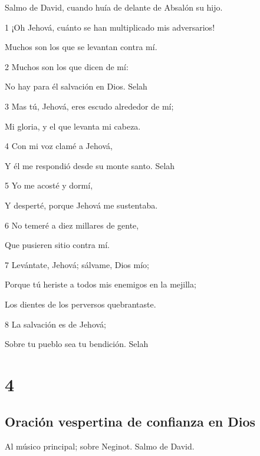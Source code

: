\par Salmo de David, cuando huía de delante de Absalón su hijo.

\par 1 ¡Oh Jehová, cuánto se han multiplicado mis adversarios!
\par Muchos son los que se levantan contra mí.
\par 2 Muchos son los que dicen de mí:
\par No hay para él salvación en Dios. Selah
\par 3 Mas tú, Jehová, eres escudo alrededor de mí;
\par Mi gloria, y el que levanta mi cabeza.
\par 4 Con mi voz clamé a Jehová,
\par Y él me respondió desde su monte santo. Selah
\par 5 Yo me acosté y dormí,
\par Y desperté, porque Jehová me sustentaba.
\par 6 No temeré a diez millares de gente,
\par Que pusieren sitio contra mí.
\par 7 Levántate, Jehová; sálvame, Dios mío;
\par Porque tú heriste a todos mis enemigos en la mejilla;
\par Los dientes de los perversos quebrantaste.
\par 8 La salvación es de Jehová;
\par Sobre tu pueblo sea tu bendición. Selah

\chapter{4}

\section*{Oración vespertina de confianza en Dios}

\par Al músico principal; sobre Neginot. Salmo de David.

